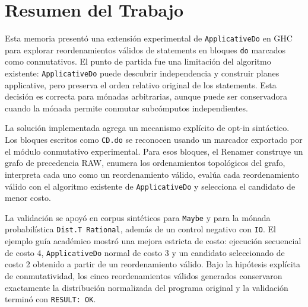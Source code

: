 
\section{Resumen del Trabajo}

Esta memoria presentó una extensión experimental de \texttt{ApplicativeDo} en \textsf{GHC} para explorar reordenamientos válidos de statements en bloques \texttt{do} marcados como conmutativos. El punto de partida fue una limitación del algoritmo existente: \texttt{ApplicativeDo} puede descubrir independencia y construir planes applicative, pero preserva el orden relativo original de los statements. Esta decisión es correcta para mónadas arbitrarias, aunque puede ser conservadora cuando la mónada permite conmutar subcómputos independientes.

La solución implementada agrega un mecanismo explícito de opt-in sintáctico. Los bloques escritos como \texttt{CD.do} se reconocen usando un marcador exportado por el módulo conmutativo experimental. Para esos bloques, el Renamer construye un grafo de precedencia RAW, enumera los ordenamientos topológicos del grafo, interpreta cada uno como un reordenamiento válido, evalúa cada reordenamiento válido con el algoritmo existente de \texttt{ApplicativeDo} y selecciona el candidato de menor costo.

La validación se apoyó en corpus sintéticos para \texttt{Maybe} y para la mónada probabilística \texttt{Dist.T Rational}, además de un control negativo con \texttt{IO}. El ejemplo guía académico mostró una mejora estricta de costo: ejecución secuencial de costo 4, \texttt{ApplicativeDo} normal de costo 3 y un candidato seleccionado de costo 2 obtenido a partir de un reordenamiento válido. Bajo la hipótesis explícita de conmutatividad, los cinco reordenamientos válidos generados conservaron exactamente la distribución normalizada del programa original y la validación terminó con \texttt{RESULT: OK}.
